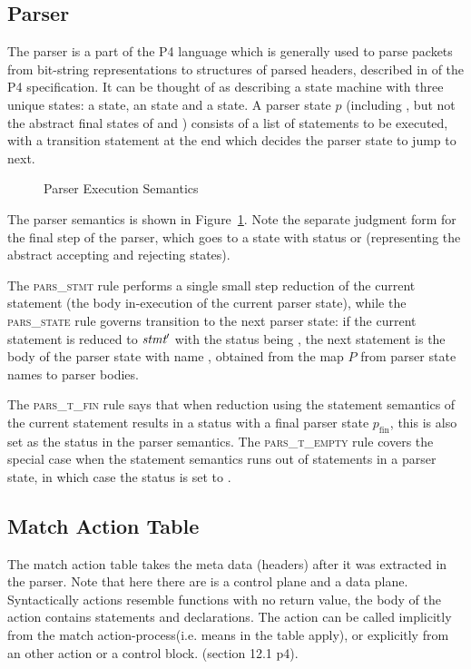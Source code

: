 \documentclass[UTF8]{article}
\begin{document}
\subsection{Parser}
The parser is a part of the P4 language which is generally used to parse packets from bit-string representations to structures of parsed headers, described in  of the P4 specification. It can be thought of as describing a state machine with three unique states: a \start{} state, an \accept{} state and a \reject{\msg{}} state. A parser state $p$ (including \start{}, but not the abstract final states of \accept{} and \reject{\msg{}}) consists of a list of statements to be executed, with a transition statement at the end which decides the parser state to jump to next.
\begin{figure}[ht!]
\ottdefnsparsXXsem
\ottdefnsparsXXtXXsem
\caption{Parser Execution Semantics}
\label{fig:semparsexec}
\end{figure}

The parser semantics is shown in Figure~\ref{fig:semparsexec}. Note the separate judgment form for the final step of the parser, which goes to a state with status \accept{} or \reject{} (representing the abstract accepting and rejecting states).

The \textsc{pars\_stmt} rule performs a single small step reduction of the current statement (the body in-execution of the current parser state), while the \textsc{pars\_state} rule governs transition to the next parser state: if the current statement \stmt{} is reduced to $\textit{stmt}{}'$ with the status being \trans{\str{}}, the next statement is the body of the parser state with name \str{}, obtained from the map $P$ from parser state names to parser bodies.

The \textsc{pars\_t\_fin} rule says that when reduction using the statement semantics of the current statement results in a status with a final parser state $p_{\mathrm{fin}}$, this is also set as the status in the parser semantics. The \textsc{pars\_t\_empty} rule covers the special case when the statement semantics runs out of statements in a parser state, in which case the status is set to .

\subsection{Match Action Table}
 The match action table takes the meta data (headers) after it was extracted in the parser. Note that here there are is a control plane and a data plane. 
Syntactically actions resemble functions with no return value, the body of the action contains statements and declarations. The action can be called implicitly from the match action-process(i.e. means in the table apply), or explicitly from an other action or a control block. (section 12.1 p4).
\end{document}
